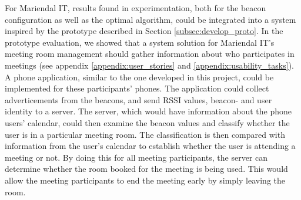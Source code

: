 For Mariendal IT, results found in experimentation, both for the beacon configuration as well as the optimal algorithm, could be integrated into a system inspired by the prototype described in Section \ref{subsec:develop_proto}. 
In the prototype evaluation, we showed that a system solution for Mariendal IT's meeting room management should gather information about who participates in meetings (see appendix \ref{appendix:user_stories} and \ref{appendix:usability_tasks}).
A phone application, similar to the one developed in this project, could be implemented for these participants' phones. 
The application could collect adverticements from the beacons, and send RSSI values, beacon- and user identity to a server.
The server, which would have information about the phone users' calendar, could then examine the beacon values and classify whether the user is in a particular meeting room.
The classification is then compared with information from the user's calendar to establish whether the user is attending a meeting or not. 
By doing this for all meeting participants, the server can determine whether the room booked for the meeting is being used.  
This would allow the meeting participants to end the meeting early by simply leaving the room.

